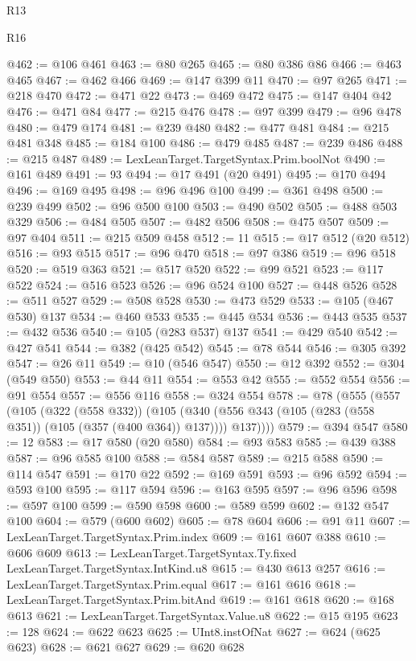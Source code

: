 \begin{lexlean}{R13}
\begin{lexlean}{R16}
\begin{coremodule}
{{{{{{{{{{{{{{{{{{{{{{{{{{{{{{{{{{{{{{{{{{{{{{{{{{{{{{{{{{{{{{{{{{{{{{{{{{{{{{{{{{{{{{{{{{{{{{{{{{{{{{{{{{{{{{{{{@462 := @106 @461
@463 := @80 @265
@465 := @80 @386 @86
@466 := @463 @465
@467 := @462 @466
@469 := @147 @399 @11
@470 := @97 @265
@471 := @218 @470
@472 := @471 @22
@473 := @469 @472
@475 := @147 @404 @42
@476 := @471 @84
@477 := @215 @476
@478 := @97 @399
@479 := @96 @478
@480 := @479 @174
@481 := @239 @480
@482 := @477 @481
@484 := @215 @481 @348
@485 := @184 @100
@486 := @479 @485
@487 := @239 @486
@488 := @215 @487
@489 := LexLeanTarget.TargetSyntax.Prim.boolNot
@490 := @161 @489
@491 := 93
@494 := @17 @491 (@20 @491)
@495 := @170 @494
@496 := @169 @495
@498 := @96 @496 @100
@499 := @361 @498
@500 := @239 @499
@502 := @96 @500 @100
@503 := @490 @502
@505 := @488 @503 @329
@506 := @484 @505
@507 := @482 @506
@508 := @475 @507
@509 := @97 @404
@511 := @215 @509 @458
@512 := 11
@515 := @17 @512 (@20 @512)
@516 := @93 @515
@517 := @96 @470
@518 := @97 @386
@519 := @96 @518
@520 := @519 @363
@521 := @517 @520
@522 := @99 @521
@523 := @117 @522
@524 := @516 @523
@526 := @96 @524 @100
@527 := @448 @526
@528 := @511 @527
@529 := @508 @528
@530 := @473 @529
@533 := @105 (@467 @530) @137
@534 := @460 @533
@535 := @445 @534
@536 := @443 @535
@537 := @432 @536
@540 := @105 (@283 @537) @137
@541 := @429 @540
@542 := @427 @541
@544 := @382 (@425 @542)
@545 := @78 @544
@546 := @305 @392
@547 := @26 @11
@549 := @10 (@546 @547)
@550 := @12 @392
@552 := @304 (@549 @550)
@553 := @44 @11
@554 := @553 @42
@555 := @552 @554
@556 := @91 @554
@557 := @556 @116
@558 := @324 @554
@578 := @78
    (@555
      (@557
        (@105
          (@322 (@558 @332))
          (@105 (@340 (@556 @343 (@105 (@283 (@558 @351)) (@105 (@357 (@400 @364)) @137)))) @137))))
@579 := @394 @547
@580 := 12
@583 := @17 @580 (@20 @580)
@584 := @93 @583
@585 := @439 @388
@587 := @96 @585 @100
@588 := @584 @587
@589 := @215 @588
@590 := @114 @547
@591 := @170 @22
@592 := @169 @591
@593 := @96 @592
@594 := @593 @100
@595 := @117 @594
@596 := @163 @595
@597 := @96 @596
@598 := @597 @100
@599 := @590 @598
@600 := @589 @599
@602 := @132 @547 @100
@604 := @579 (@600 @602)
@605 := @78 @604
@606 := @91 @11
@607 := LexLeanTarget.TargetSyntax.Prim.index
@609 := @161 @607 @388
@610 := @606 @609
@613 := LexLeanTarget.TargetSyntax.Ty.fixed LexLeanTarget.TargetSyntax.IntKind.u8
@615 := @430 @613 @257
@616 := LexLeanTarget.TargetSyntax.Prim.equal
@617 := @161 @616
@618 := LexLeanTarget.TargetSyntax.Prim.bitAnd
@619 := @161 @618
@620 := @168 @613
@621 := LexLeanTarget.TargetSyntax.Value.u8
@622 := @15 @195
@623 := 128
@624 := @622 @623
@625 := UInt8.instOfNat
@627 := @624 (@625 @623)
@628 := @621 @627
@629 := @620 @628
}}}}}}}}}}}}}}}}}}}}}}}}}}}}}}}}}}}}}}}}}}}}}}}}}}}}}}}}}}}}}}}}}}}}}}}}}}}}}}}}}}}}}}}}}}}}}}}}}}}}}}}}}}}}}}}}}
\end{coremodule}
\end{lexlean}
\end{lexlean}
